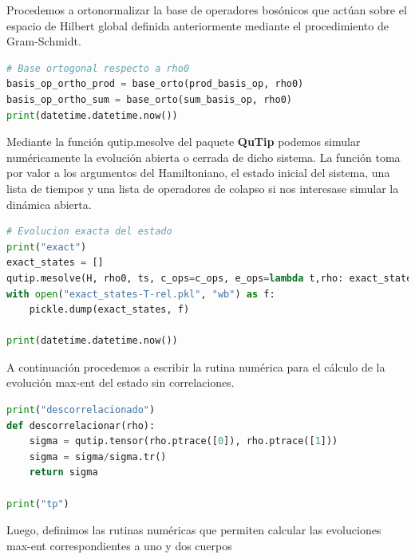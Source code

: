 \documentclass{report} %
\numberwithin{equation}{section}
\begin{document}
Procedemos a ortonormalizar la base de operadores bosónicos que actúan sobre el espacio de Hilbert global definida anteriormente mediante el procedimiento de Gram-Schmidt. 

\begin{lstlisting}[language=Python]
# Base ortogonal respecto a rho0
basis_op_ortho_prod = base_orto(prod_basis_op, rho0)
basis_op_ortho_sum = base_orto(sum_basis_op, rho0)
print(datetime.datetime.now())
\end{lstlisting}

Mediante la función qutip.mesolve del paquete \textbf{QuTip} podemos simular numéricamente la evolución abierta o cerrada de dicho sistema. La función toma por valor a los argumentos del Hamiltoniano, el estado inicial del sistema, una lista de tiempos y una lista de operadores de colapso si nos interesase simular la dinámica abierta.

\begin{lstlisting}[language=Python]
# Evolucion exacta del estado
print("exact")
exact_states = []
qutip.mesolve(H, rho0, ts, c_ops=c_ops, e_ops=lambda t,rho: exact_states.append(rho))
with open("exact_states-T-rel.pkl", "wb") as f:
    pickle.dump(exact_states, f)

print(datetime.datetime.now())
\end{lstlisting}


A continuación procedemos a escribir la rutina numérica para el cálculo de la evolución max-ent del estado sin correlaciones.

\begin{lstlisting}[language=Python]
print("descorrelacionado")
def descorrelacionar(rho):
    sigma = qutip.tensor(rho.ptrace([0]), rho.ptrace([1]))
    sigma = sigma/sigma.tr()
    return sigma

print("tp")
\end{lstlisting}

Luego, definimos las rutinas numéricas que permiten calcular las evoluciones max-ent correspondientes a uno y dos cuerpos
\end{document}
